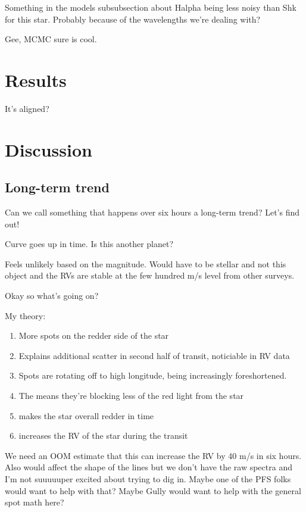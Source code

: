 \documentclass[twocolumn]{aastex62}
\begin{document}
Something in the models subsubsection about Halpha being less noisy than Shk for this star. Probably because of the wavelengths we're dealing with?

Gee, MCMC sure is cool.


\section{Results}

It's aligned?

\section{Discussion}

\subsection{Long-term trend}

Can we call something that happens over six hours a long-term trend? Let's find out!

Curve goes up in time. Is this another planet?

Feels unlikely based on the magnitude.
Would have to be stellar and not this object and the RVs are stable at the few hundred m/s level from other surveys.

Okay so what's going on?

My theory:
\begin{enumerate}
    \item More spots on the redder side of the star 
    \item Explains additional scatter in second half of transit, noticiable in RV data
    \item Spots are rotating off to high longitude, being increasingly foreshortened.
    \item The means they're blocking less of the red light from the star
    \item makes the star overall redder in time
    \item increases the RV of the star during the transit
\end{enumerate}

We need an OOM estimate that this can increase the RV by 40 m/s in six hours.
Also would affect the shape of the lines but we don't have the raw spectra and I'm not suuuuuper excited about trying to dig in. Maybe one of the PFS folks would want to help with that? 
Maybe Gully would want to help with the general spot math here?
\end{document}
